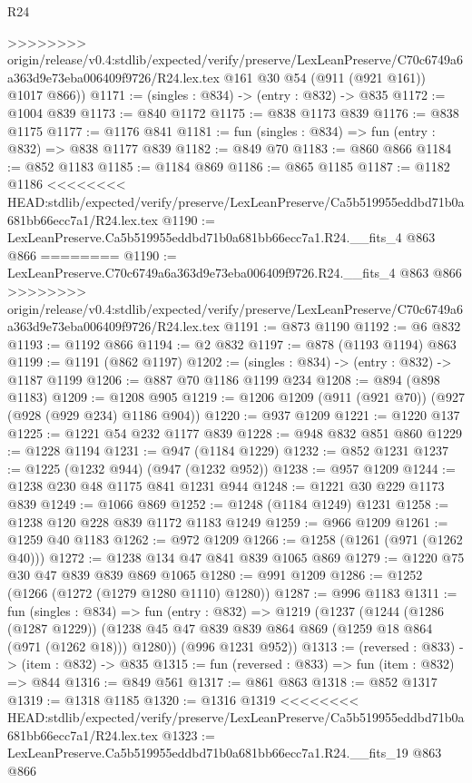 \begin{lexlean}{R24}
\begin{coremodule}
{{{{{{{{{{{{{{{{{{{{{{{{{{{{{{{{{{{>>>>>>>> origin/release/v0.4:stdlib/expected/verify/preserve/LexLeanPreserve/C70c6749a6a363d9e73eba006409f9726/R24.lex.tex
        @161
        @30
        @54
        (@911 (@921 @161))
        @1017
        @866))
@1171 := (singles : @834) -> (entry : @832) -> @835
@1172 := @1004 @839
@1173 := @840 @1172
@1175 := @838 @1173 @839
@1176 := @838 @1175
@1177 := @1176 @841
@1181 := fun (singles : @834) => fun (entry : @832) => @838 @1177 @839
@1182 := @849 @70
@1183 := @860 @866
@1184 := @852 @1183
@1185 := @1184 @869
@1186 := @865 @1185
@1187 := @1182 @1186
<<<<<<<< HEAD:stdlib/expected/verify/preserve/LexLeanPreserve/Ca5b519955eddbd71b0a681bb66ecc7a1/R24.lex.tex
@1190 := LexLeanPreserve.Ca5b519955eddbd71b0a681bb66ecc7a1.R24.__fits_4 @863 @866
========
@1190 := LexLeanPreserve.C70c6749a6a363d9e73eba006409f9726.R24.__fits_4 @863 @866
>>>>>>>> origin/release/v0.4:stdlib/expected/verify/preserve/LexLeanPreserve/C70c6749a6a363d9e73eba006409f9726/R24.lex.tex
@1191 := @873 @1190
@1192 := @6 @832
@1193 := @1192 @866
@1194 := @2 @832
@1197 := @878 (@1193 @1194) @863
@1199 := @1191 (@862 @1197)
@1202 := (singles : @834) -> (entry : @832) -> @1187 @1199
@1206 := @887 @70 @1186 @1199 @234
@1208 := @894 (@898 @1183)
@1209 := @1208 @905
@1219 := @1206 @1209 (@911 (@921 @70)) (@927 (@928 (@929 @234) @1186 @904))
@1220 := @937 @1209
@1221 := @1220 @137
@1225 := @1221 @54 @232 @1177 @839
@1228 := @948 @832 @851 @860
@1229 := @1228 @1194
@1231 := @947 (@1184 @1229)
@1232 := @852 @1231
@1237 := @1225 (@1232 @944) (@947 (@1232 @952))
@1238 := @957 @1209
@1244 := @1238 @230 @48 @1175 @841 @1231 @944
@1248 := @1221 @30 @229 @1173 @839
@1249 := @1066 @869
@1252 := @1248 (@1184 @1249) @1231
@1258 := @1238 @120 @228 @839 @1172 @1183 @1249
@1259 := @966 @1209
@1261 := @1259 @40 @1183
@1262 := @972 @1209
@1266 := @1258 (@1261 (@971 (@1262 @40)))
@1272 := @1238 @134 @47 @841 @839 @1065 @869
@1279 := @1220 @75 @30 @47 @839 @839 @869 @1065
@1280 := @991 @1209
@1286 := @1252 (@1266 (@1272 (@1279 @1280 @1110) @1280))
@1287 := @996 @1183
@1311 := fun (singles : @834) =>
  fun (entry : @832) =>
  @1219
    (@1237
      (@1244
        (@1286 (@1287 @1229))
        (@1238 @45 @47 @839 @839 @864 @869 (@1259 @18 @864 (@971 (@1262 @18))) @1280))
      (@996 @1231 @952))
@1313 := (reversed : @833) -> (item : @832) -> @835
@1315 := fun (reversed : @833) => fun (item : @832) => @844
@1316 := @849 @561
@1317 := @861 @863
@1318 := @852 @1317
@1319 := @1318 @1185
@1320 := @1316 @1319
<<<<<<<< HEAD:stdlib/expected/verify/preserve/LexLeanPreserve/Ca5b519955eddbd71b0a681bb66ecc7a1/R24.lex.tex
@1323 := LexLeanPreserve.Ca5b519955eddbd71b0a681bb66ecc7a1.R24.__fits_19 @863 @866
}}}}}}}}}}}}}}}}}}}}}}}}}}}}}}}}}}}
\end{coremodule}
\end{lexlean}
